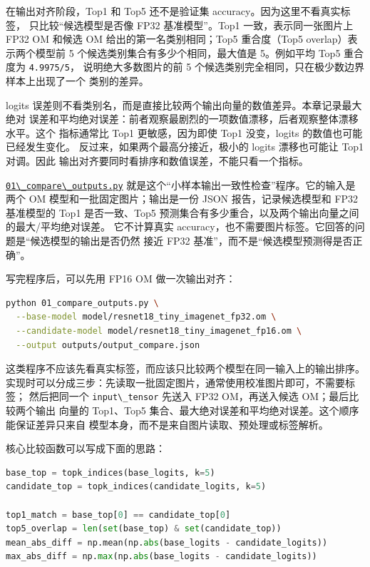 在输出对齐阶段，Top1 和 Top5 还不是验证集
accuracy。因为这里不看真实标签， 只比较``候选模型是否像 FP32
基准模型''。Top1 一致，表示同一张图片上 FP32 OM 和候选 OM
给出的第一名类别相同；Top5 重合度（Top5 overlap）表示两个模型前 5
个候选类别集合有多少个相同，最大值是 5。例如平均 Top5 重合度为
\passthrough{\lstinline!4.9975/5!}， 说明绝大多数图片的前 5
个候选类别完全相同，只在极少数边界样本上出现了一个 类别的差异。

logits
误差则不看类别名，而是直接比较两个输出向量的数值差异。本章记录最大绝对
误差和平均绝对误差：前者观察最剧烈的一项数值漂移，后者观察整体漂移水平。这个
指标通常比 Top1 更敏感，因为即使 Top1 没变，logits
的数值也可能已经发生变化。 反过来，如果两个最高分接近，极小的 logits
漂移也可能让 Top1 对调。因此
输出对齐要同时看排序和数值误差，不能只看一个指标。

\href{https://github.com/zhouxzh/Ascend310/blob/main/samples/chapter9/01_compare_outputs.py}{\passthrough{\lstinline!01\_compare\_outputs.py!}}
就是这个``小样本输出一致性检查''程序。它的输入是两个 OM
模型和一批固定图片；输出是一份 JSON 报告，记录候选模型和 FP32 基准模型的
Top1 是否一致、Top5
预测集合有多少重合，以及两个输出向量之间的最大/平均绝对误差。
它不计算真实
accuracy，也不需要图片标签。它回答的问题是``候选模型的输出是否仍然 接近
FP32 基准''，而不是``候选模型预测得是否正确''。

写完程序后，可以先用 FP16 OM 做一次输出对齐：

\begin{lstlisting}[language=bash]
python 01_compare_outputs.py \
  --base-model model/resnet18_tiny_imagenet_fp32.om \
  --candidate-model model/resnet18_tiny_imagenet_fp16.om \
  --output outputs/output_compare.json
\end{lstlisting}

这类程序不应该先看真实标签，而应该只比较两个模型在同一输入上的输出排序。
实现时可以分成三步：先读取一批固定图片，通常使用校准图片即可，不需要标签；
然后把同一个 \passthrough{\lstinline!input\_tensor!} 先送入 FP32
OM，再送入候选 OM；最后比较两个输出 向量的 Top1、Top5
集合、最大绝对误差和平均绝对误差。这个顺序能保证差异只来自
模型本身，而不是来自图片读取、预处理或标签解析。

核心比较函数可以写成下面的思路：

\begin{lstlisting}[language=Python]
base_top = topk_indices(base_logits, k=5)
candidate_top = topk_indices(candidate_logits, k=5)

top1_match = base_top[0] == candidate_top[0]
top5_overlap = len(set(base_top) & set(candidate_top))
mean_abs_diff = np.mean(np.abs(base_logits - candidate_logits))
max_abs_diff = np.max(np.abs(base_logits - candidate_logits))
\end{lstlisting}

